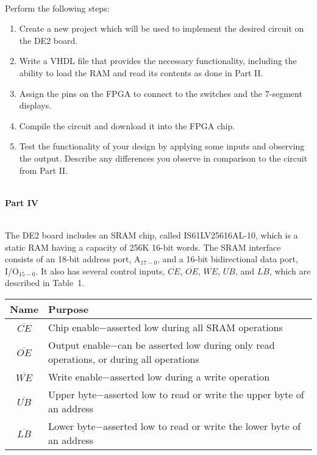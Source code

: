 \documentclass[psfig,10pt,fullpage]{article}
\begin{document}
~\\
Perform the following steps:

\begin{enumerate}
\item Create a new project which will be used to implement the desired
circuit on the DE2 board.
\item Write a VHDL file that provides the necessary functionality,
including the ability to load the RAM and read its contents as done in
Part II.
\item Assign the pins on the FPGA to connect to the switches and the 
7-segment displays.
\item Compile the circuit and download it into the FPGA chip.
\item Test the functionality of your design by applying some inputs
and observing the output. Describe any differences you observe in comparison to the
circuit from Part II.
\end{enumerate}

~\\
\noindent
{\bf Part IV}

~\\
\noindent
The DE2 board includes an SRAM chip, called IS61LV25616AL-10, which is a static RAM having
a capacity of 256K 16-bit words. The SRAM interface consists of an 18-bit address
port, A$_{17-0}$, and a 16-bit bidirectional data port, 
I/O$_{15-0}$. It also has several control inputs,
$\overline{CE}$, $\overline{OE}$, $\overline{WE}$, $\overline{UB}$, and $\overline{LB}$, which 
are described in Table~1.
~\\
\begin{center}
\begin{tabular}{c|l}
Name & Purpose \\ \hline
\rule[-0.075in]{0in}{0.25in} $\overline{CE}$ & Chip enable$-$asserted low during all SRAM operations \\ 
$\overline{OE}$ & Output enable$-$can be asserted low during only read operations, or during all operations \\ 
$\overline{WE}$ & Write enable$-$asserted low during a write operation \\ 
$\overline{UB}$ & Upper byte$-$asserted low to read or write the upper byte of an address \\ 
$\overline{LB}$ & Lower byte$-$asserted low to read or write the lower byte of an address \\ 
\end{tabular}
\end{center}
\end{document}
